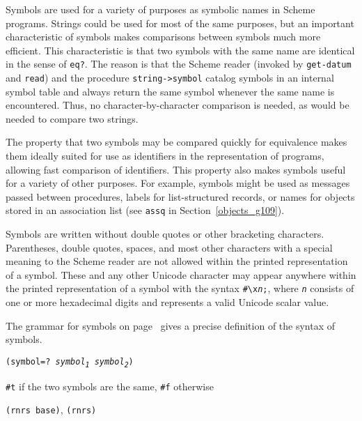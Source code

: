 \label{objects_s266}Symbols are used for a variety of purposes as symbolic names in
Scheme programs.
Strings could be used for most of the same purposes, but an
important characteristic of symbols makes comparisons between
symbols much more efficient.
This characteristic is that two symbols with the same name are
identical in the sense of \texttt{eq?}.
The reason is that the Scheme reader (invoked by \texttt{get-datum} and \texttt{read})
and the procedure \texttt{string-\textgreater{}symbol} catalog symbols in an internal
\label{objects_s267}symbol table and always return the same symbol whenever the same name is
encountered.
Thus, no character-by-character comparison is needed, as would be
needed to compare two strings.


The property that two symbols may be compared quickly for equivalence
makes them ideally suited for use as identifiers in the representation
of programs, allowing fast comparison of identifiers.
This property also makes symbols useful for a variety of other
purposes.
For example, symbols might be used as messages passed between
procedures, labels for list-structured records, or names for objects
stored in an association list (see \texttt{assq} in Section \ref{objects_g109}).


Symbols are written without double quotes or other bracketing
characters.
Parentheses, double quotes, spaces, and most other characters with a
special meaning to the Scheme reader are not allowed within the printed
representation of a symbol.
These and any other Unicode character may appear anywhere within the
printed representation of a symbol with the syntax \texttt{\#{}\textbackslash{}x\textit{n};},
where \texttt{\textit{n}} consists of one or more hexadecimal digits and represents
a valid Unicode scalar value.


The grammar for symbols on page \pageref{grammar_grammar_symbols} gives a
precise definition of the syntax of symbols.


\begin{description}

\label{objects_s268}\item[procedure] \texttt{(symbol=? \textit{symbol\textsubscript{1}} \textit{symbol\textsubscript{2}})}



\item[returns] \texttt{\#{}t} if the two symbols are the same, \texttt{\#{}f} otherwise


\item[libraries] \texttt{(rnrs base)}, \texttt{(rnrs)}
\end{description}


